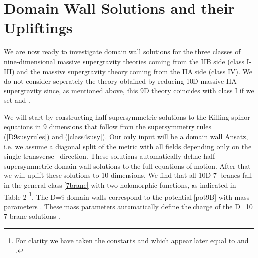 \documentclass[12pt,a4paper]{article}
\begin{document}
\section{Domain Wall Solutions and their Upliftings}

We are now ready to investigate domain wall solutions for the
three classes of nine-dimensional massive supergravity theories
coming from the IIB side (class I-III) and the massive supergravity
theory coming from the IIA side (class IV). We do not consider
seperately the theory obtained by reducing 10D massive IIA
supergravity since, as mentioned above, this 9D theory coincides
with class I if we set \coordHE{} and \coordHE{}.

We will start by constructing half-supersymmetric solutions
to the Killing spinor equations in 9 dimensions that follow from
the supersymmetry rules (\ref{D9susyrules}) and (\ref{class4susy}).
Our only input will be a domain wall Ansatz, i.e. we assume a
diagonal \coordHE{} split of the metric with all fields depending only
on the single transverse \coordHE{}--direction. These solutions
automatically define half--supersymmetric domain wall solutions to
the full equations of motion. After that we will uplift these
solutions to 10 dimensions. We find that all 10D 7--branes fall in
the general class \eqref{7brane} with two holomorphic functions,
as indicated in Table 2 \footnote{
  For clarity we have taken the constants \coordHE{} and \coordHE{} which
appear later equal to \coordHE{} and \coordHE{}.}. The D=9 domain walls correspond to the
potential \eqref{pot9B} with mass parameters
\coordHE{}. These mass parameters automatically
define the charge of the D=10 7-brane solutions
\cite{Meessen:1998qm}.
\end{document}
